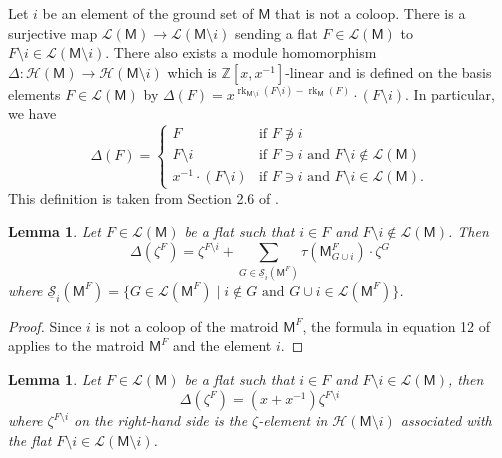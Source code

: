 \documentclass[11pt, a4paper, english]{amsart}
\theoremstyle{teoremas}
\newtheorem{lemma}[theorem]{Lemma}
\theoremstyle{definition}
\DeclareMathOperator{\rk}{rk}
\newcommand{\M}{\mathsf{M}}
\newcommand{\cL}{\mathcal{L}}
\newcommand{\cH}{\mathcal{H}}
\begin{document}
Let $i$ be an element of the ground set of $\M$ that is not a coloop.
There is a surjective map $\cL(\M) \to \cL(\M\setminus i)$ sending a flat $F \in \cL(\M)$ to $F\setminus i \in \cL(\M\setminus i)$.
There also exists a module homomorphism $\Delta: \cH(\M) \to \cH(\M\setminus i)$ which
is $\mathbb{Z}[x, x^{-1}]$-linear and is defined on the basis elements $F \in \cL(\M)$ by
$\Delta(F) = x^{\rk_{\M\setminus i}(F\setminus i)- \rk_\M(F)} \cdot (F\setminus i)$. In particular, we have
\begin{equation}
    \Delta(F) = \begin{cases}
        F                          & \text{if }F\not\ni i                                      \\
        F\setminus i               & \text{if } F\ni i \text{ and }F\setminus i \notin \cL(\M) \\
        x^{-1}\cdot (F\setminus i) & \text{if } F\ni i \text{ and }F\setminus i \in \cL(\M).
    \end{cases}
\end{equation}
This definition is taken from Section 2.6 of \cite{braden-vysogorets}.

\begin{lemma}
    \label{lem:delta_zeta_nocoloop}
    Let $F \in \cL(\M)$ be a flat such that $i \in F$ and $F\setminus i \notin \cL(\M)$. Then
    \begin{equation}
        \Delta(\zeta^F) = \zeta^{F\setminus i} + \sum_{G\in \underline{\mathscr{S}}_i(\M^F)}\tau(\M^F_{G\cup i})\cdot\zeta^G
    \end{equation}
    where $\underline{\mathscr{S}}_i(\M^F) = \{G\in \cL(\M^F)\mid i\notin G \text{ and } G\cup i \in \cL(\M^F)\}$.
\end{lemma}
\begin{proof}
    Since $i$ is not a coloop of the matroid $\M^F$, the formula in equation 12 of \cite{braden-vysogorets} applies to the matroid $\M^F$ and the element $i$.
\end{proof}

\begin{lemma}\label{lem:delta_zeta_special_case}
    Let $F \in \cL(\M)$ be a flat such that $i \in F$ and $F\setminus i \in \cL(\M)$, then
    \[ \Delta(\zeta^F) = (x + x^{-1})\zeta^{F\setminus i} \]
    where $\zeta^{F\setminus i}$ on the right-hand side is the $\zeta$-element in
    $\cH(\M\setminus i)$ associated with the flat $F\setminus i \in \cL(\M\setminus i)$.
\end{lemma}
\end{document}
